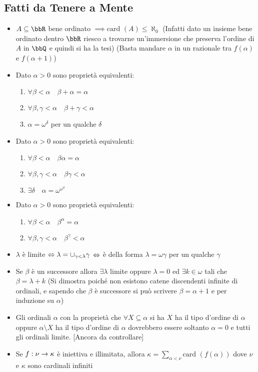 \documentclass[a4paper,NoNotes,GeneralMath]{stdmdoc}
\newcommand{\card}[1]{\text{card }({#1})}
\begin{document}
	\subsection*{Fatti da Tenere a Mente}
	\begin{itemize}
		\item $A \subseteq \bbR$ bene ordinato $\implies \card{A} \le \aleph_0$ (Infatti dato un insieme bene ordinato dentro $\bbR$ riesco a trovarne un'immersione che preserva l'ordine di $A$ in $\bbQ$ e quindi si ha la tesi) (Basta mandare $\alpha$ in un razionale tra $f(\alpha)$ e $f(\alpha + 1)$)
		\item Dato $\alpha > 0$ sono proprietà equivalenti:
			\begin{enumerate}
				\item $\forall \beta < \alpha \quad \beta + \alpha = \alpha$
				\item $\forall \beta, \gamma < \alpha \quad \beta + \gamma < \alpha$
				\item $\alpha = \omega ^ \delta$ per un qualche $\delta$
			\end{enumerate}
		\item Dato $\alpha > 0$ sono proprietà equivalenti:
			\begin{enumerate}
				\item $\forall \beta < \alpha \quad \beta \alpha = \alpha$
				\item $\forall \beta, \gamma < \alpha \quad \beta \gamma < \alpha$
				\item $\exists \delta \quad \alpha = \omega^{\omega^\delta}$
			\end{enumerate}
		\item Dato $\alpha > 0$ sono proprietà equivalenti:
			\begin{enumerate}
				\item $\forall \beta < \alpha \quad \beta^\alpha = \alpha$
				\item $\forall \beta, \gamma < \alpha \quad \beta^\gamma < \alpha$
			\end{enumerate}
		\item $\lambda$ è limite $\Leftrightarrow \lambda = \cup_{\gamma < \lambda} \gamma$ $\Leftrightarrow$ è della forma $\lambda = \omega \gamma$ per un qualche $\gamma$
		\item Se $\beta$ è un successore allora $\exists \lambda$ limite oppure $\lambda = 0$ ed $\exists k \in \omega$ tali che $\beta = \lambda + k$ (Si dimostra poiché non esistono catene discendenti infinite di ordinali, e sapendo che $\beta$ è successore si può scrivere $\beta = \alpha + 1$ e per induzione su $\alpha$)
		\item Gli ordinali $\alpha$ con la proprietà che $\forall X \subseteq \alpha$ si ha $X$ ha il tipo d'ordine di $\alpha$ oppure $\alpha \setminus X$ ha il tipo d'ordine di $\alpha$ dovrebbero essere soltanto $\alpha = 0$ e tutti gli ordinali limite. [Ancora da controllare]
		\item Se $f: \nu \rightarrow \kappa$ è iniettiva e illimitata, allora $\kappa = \sum_{\alpha < \nu} \card{f(\alpha)}$ dove $\nu$ e $\kappa$ sono cardinali infiniti
	\end{itemize}
	
\end{document}
